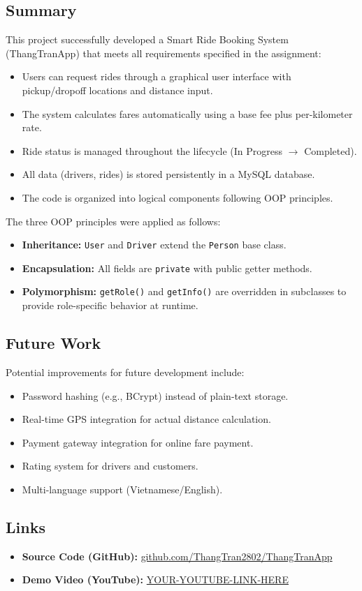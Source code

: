 \documentclass[fonts]{icst}
\begin{document}
\subsection{Summary}

This project successfully developed a Smart Ride Booking System (ThangTranApp) that meets all requirements specified in the assignment:

\begin{itemize}
    \item Users can request rides through a graphical user interface with pickup/dropoff locations and distance input.
    \item The system calculates fares automatically using a base fee plus per-kilometer rate.
    \item Ride status is managed throughout the lifecycle (In Progress $\rightarrow$ Completed).
    \item All data (drivers, rides) is stored persistently in a MySQL database.
    \item The code is organized into logical components following OOP principles.
\end{itemize}

The three OOP principles were applied as follows:
\begin{itemize}
    \item \textbf{Inheritance:} \texttt{User} and \texttt{Driver} extend the \texttt{Person} base class.
    \item \textbf{Encapsulation:} All fields are \texttt{private} with public getter methods.
    \item \textbf{Polymorphism:} \texttt{getRole()} and \texttt{getInfo()} are overridden in subclasses to provide role-specific behavior at runtime.
\end{itemize}

\subsection{Future Work}

Potential improvements for future development include:
\begin{itemize}
    \item Password hashing (e.g., BCrypt) instead of plain-text storage.
    \item Real-time GPS integration for actual distance calculation.
    \item Payment gateway integration for online fare payment.
    \item Rating system for drivers and customers.
    \item Multi-language support (Vietnamese/English).
\end{itemize}

\subsection{Links}

\begin{itemize}
    \raggedright
    \item \textbf{Source Code (GitHub):} \href{https://github.com/ThangTran2802/ThangTranApp}{github.com/ThangTran2802/ThangTranApp}
    \item \textbf{Demo Video (YouTube):} \url{YOUR-YOUTUBE-LINK-HERE}
\end{itemize}


\vspace{12pt}
\vspace{12pt}
\end{document}
